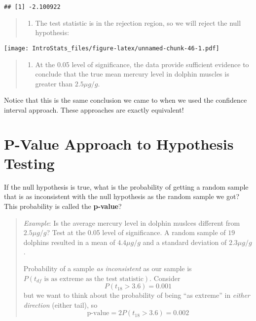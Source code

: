 \documentclass[
]{book}
\providecommand{\tightlist}{%
  \setlength{\itemsep}{0pt}\setlength{\parskip}{0pt}}
\begin{document}
\begin{verbatim}
## [1] -2.100922
\end{verbatim}

\begin{quote}
\begin{enumerate}
\def\labelenumi{\arabic{enumi}.}
\setcounter{enumi}{4}
\tightlist
\item
  The test statistic is in the rejection region, so we will reject the null hypothesis:
\end{enumerate}
\end{quote}

\texttt{[image: IntroStats\_files/figure-latex/unnamed-chunk-46-1.pdf]}

\begin{quote}
\begin{enumerate}
\def\labelenumi{\arabic{enumi}.}
\setcounter{enumi}{5}
\tightlist
\item
  At the 0.05 level of significance, the data provide sufficient evidence to conclude that the true mean mercury level in dolphin muscles is greater than \(2.5\mu g/g\).
\end{enumerate}
\end{quote}

Notice that this is the same conclusion we came to when we used the confidence interval approach. These approaches are exactly equivalent!

\hypertarget{p-value-approach-to-hypothesis-testing}{%
\section{P-Value Approach to Hypothesis Testing}\label{p-value-approach-to-hypothesis-testing}}

If the null hypothesis is true, what is the probability of getting a random sample that is as inconsistent with the null hypothesis as the random sample we got? This probability is called the \textbf{p-value}?

\begin{quote}
\emph{Example}: Is the average mercury level in dolphin muslces different from \(2.5\mu g/g\)? Test at the 0.05 level of significance. A random sample of \(19\) dolphins resulted in a mean of \(4.4 \mu g/g\) and a standard deviation of \(2.3 \mu g/g\).

Probability of a sample \emph{as inconsistent} as our sample is \(P(t_{df} \text{ is as extreme as the test statistic})\). Consider \[P(t_{18} > 3.6) = 0.001\] but we want to think about the probability of being ``as extreme'' in \emph{either direction} (either tail), so \[\text{p-value} = 2P(t_{18}>3.6) = 0.002\]
\end{quote}
\end{document}
